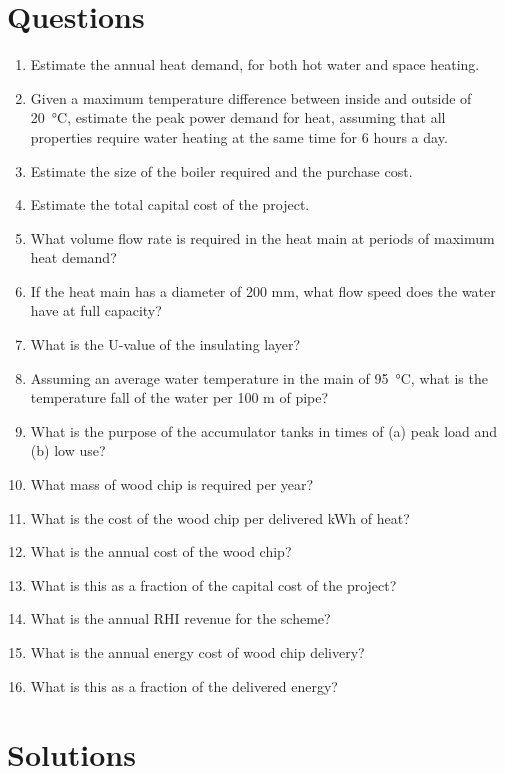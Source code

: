 \documentclass[parskip=half]{scrartcl}
\begin{document}
\section{Questions}
\begin{enumerate}
\item Estimate the annual heat demand, for both hot water and space heating.
\item Given a maximum temperature difference between inside and outside of \SI{20}{\celsius}, estimate the peak power demand for heat, assuming that all properties require water heating at the same time for 6 hours a day.
\item Estimate the size of the boiler required and the purchase cost. 
\item Estimate the total capital cost of the project.
\item What volume flow rate is required in the heat main at periods of maximum heat demand?
\item If the heat main has a diameter of 200 mm, what flow speed does the water have at full capacity?
\item What is the U-value of the insulating layer?
\item Assuming an average water temperature in the main of \SI{95}{\celsius}, what is the temperature fall of the water per 100 m of pipe?
\item What is the purpose of the accumulator tanks in times of (a) peak load and (b) low use?
\item What mass of wood chip is required per year?
\item What is the cost of the wood chip per delivered kWh of heat?
\item What is the annual cost of the wood chip?
\item What is this as a fraction of the capital cost of the project?
\item What is the annual RHI revenue for the scheme?
\item What is the annual energy cost of wood chip delivery?
\item What is this as a fraction of the delivered energy?
\end{enumerate}

\section{Solutions}
\end{document}
